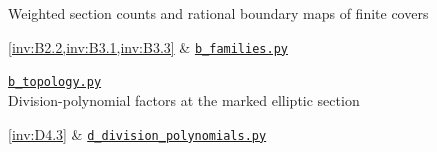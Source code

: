 \hypertarget{prog:I:covers}{}Weighted section counts and rational boundary maps of finite covers\par \cref{inv:B2.2,inv:B3.1,inv:B3.3} &
\href{https://github.com/KokunoYumeto/s6-complex-structure-workbench/blob/\SsixRepositoryCommit/pro_returns/S6_01_INVARIANTS/return/code/b_families.py}{\nolinkurl{b_families.py}}\par \href{https://github.com/KokunoYumeto/s6-complex-structure-workbench/blob/\SsixRepositoryCommit/pro_returns/S6_01_INVARIANTS/return/code/b_topology.py}{\nolinkurl{b_topology.py}} \\[3pt]
\hypertarget{prog:I:resonance}{}Division-polynomial factors at the marked elliptic section\par \cref{inv:D4.3} &
\href{https://github.com/KokunoYumeto/s6-complex-structure-workbench/blob/\SsixRepositoryCommit/pro_returns/S6_01_INVARIANTS/return/code/d_division_polynomials.py}{\nolinkurl{d_division_polynomials.py}} \\[3pt]
